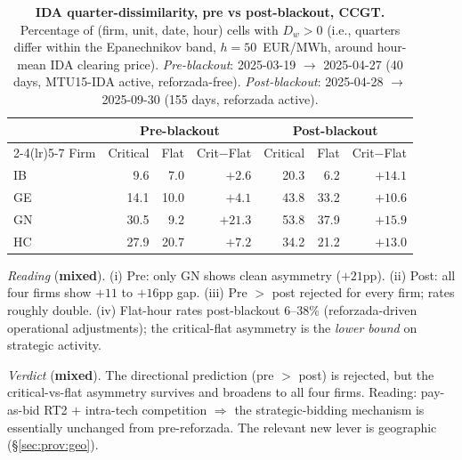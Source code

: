 \documentclass[11pt,a4paper]{article}
\newcommand{\code}[1]{\nolinkurl{#1}}
\begin{document}
\begin{table}[H]
\centering
\caption{\textbf{IDA quarter-dissimilarity, pre vs post-blackout, CCGT.} Percentage of (firm, unit, date, hour) cells with $D_w > 0$ (i.e., quarters differ within the Epanechnikov band, $h = 50$~EUR/MWh, around hour-mean IDA clearing price). \emph{Pre-blackout}: 2025-03-19 $\to$ 2025-04-27 (40 days, MTU15-IDA active, reforzada-free). \emph{Post-blackout}: 2025-04-28 $\to$ 2025-09-30 (155 days, reforzada active).}
\label{tab:ida_pre_post}
\begin{tabular}{l r r r r r r}
\toprule
& \multicolumn{3}{c}{Pre-blackout} & \multicolumn{3}{c}{Post-blackout} \\
\cmidrule(lr){2-4}\cmidrule(lr){5-7}
Firm & Critical & Flat & Crit$-$Flat & Critical & Flat & Crit$-$Flat \\
\midrule
IB &  9.6 &  7.0 & $+2.6$            & 20.3 &  6.2 & $+14.1$ \\
GE & 14.1 & 10.0 & $+4.1$            & 43.8 & 33.2 & $+10.6$ \\
GN & 30.5 &  9.2 & $\mathbf{+21.3}$  & 53.8 & 37.9 & $+15.9$ \\
HC & 27.9 & 20.7 & $+7.2$            & 34.2 & 21.2 & $+13.0$ \\
\bottomrule
\end{tabular}
\end{table}

\textit{Reading} (\textbf{mixed}). (i) Pre: only GN shows clean asymmetry ($+21$pp). (ii) Post: all four firms show $+11$ to $+16$pp gap. (iii) Pre $>$ post rejected for every firm; rates roughly double. (iv) Flat-hour rates post-blackout 6--38\% (reforzada-driven operational adjustments); the critical-flat asymmetry is the \emph{lower bound} on strategic activity.

\textit{Verdict} (\textbf{mixed}). The directional prediction (pre $>$ post) is rejected, but the critical-vs-flat asymmetry survives and broadens to all four firms. Reading: pay-as-bid RT2 + intra-tech competition $\Rightarrow$ the strategic-bidding mechanism is essentially unchanged from pre-reforzada. The relevant new lever is geographic (\S\ref{sec:prov:geo}).

\end{document}
